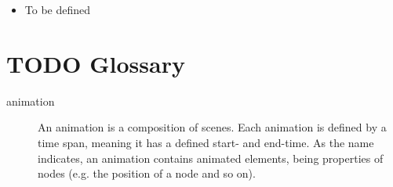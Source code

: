 \documentclass[10pt, openright, notitlepage]{scrreprt}
\begin{document}
\begin{itemize}
\item To be defined
\end{itemize}
\chapter{{\bfseries\sffamily TODO} Glossary}
\label{sec:org4140a4a}
\begin{description}
\item[{animation}] An animation is a composition of scenes. Each animation is
defined by a time span, meaning it has a defined start- and
end-time. As the name indicates, an animation contains animated
elements, being properties of nodes (e.g. the position of a node
and so on).
\end{description}
\end{document}
